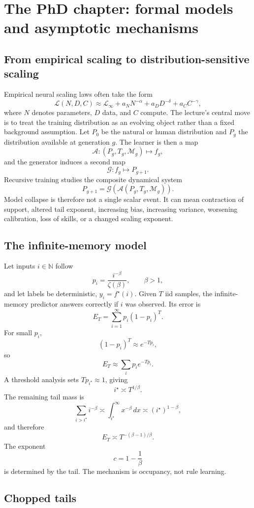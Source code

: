 \section{The PhD chapter: formal models and asymptotic mechanisms}

\subsection{From empirical scaling to distribution-sensitive scaling}

Empirical neural scaling laws often take the form
\[
\mathcal L(N,D,C)
\approx \mathcal L_\infty
+ a_N N^{-\alpha}
+ a_D D^{-\delta}
+ a_C C^{-\gamma},
\]
where $N$ denotes parameters, $D$ data, and $C$ compute. The lecture's central move is to treat the training distribution as an evolving object rather than a fixed background assumption. Let $P_0$ be the natural or human distribution and $P_g$ the distribution available at generation $g$. The learner is then a map
\[
\mathcal A:(P_g,T_g,\mathcal M_g)\mapsto f_g,
\]
and the generator induces a second map
\[
\mathcal G:f_g\mapsto P_{g+1}.
\]
Recursive training studies the composite dynamical system
\[
P_{g+1}=\mathcal G(\mathcal A(P_g,T_g,\mathcal M_g)).
\]
Model collapse is therefore not a single scalar event. It can mean contraction of support, altered tail exponent, increasing bias, increasing variance, worsening calibration, loss of skills, or a changed scaling exponent.

\subsection{The infinite-memory model}

Let inputs $i\in\mathbb N$ follow
\[
p_i = \frac{i^{-\beta}}{\zeta(\beta)},\qquad \beta>1,
\]
and let labels be deterministic, $y_i=f^\star(i)$. Given $T$ iid samples, the infinite-memory predictor answers correctly if $i$ was observed. Its error is
\[
E_T = \sum_{i=1}^{\infty} p_i(1-p_i)^T.
\]
For small $p_i$,
\[
(1-p_i)^T \approx e^{-Tp_i},
\]
so
\[
E_T \approx \sum_i p_i e^{-Tp_i}.
\]
A threshold analysis sets $Tp_{i^\star}\approx 1$, giving
\[
i^\star \asymp T^{1/\beta}.
\]
The remaining tail mass is
\[
\sum_{i>i^\star} i^{-\beta}
\asymp \int_{i^\star}^{\infty}x^{-\beta}\,dx
\asymp (i^\star)^{1-\beta},
\]
and therefore
\[
E_T\asymp T^{-(\beta-1)/\beta}.
\]
The exponent
\[
c=1-\frac{1}{\beta}
\]
is determined by the tail. The mechanism is occupancy, not rule learning.

\subsection{Chopped tails}

